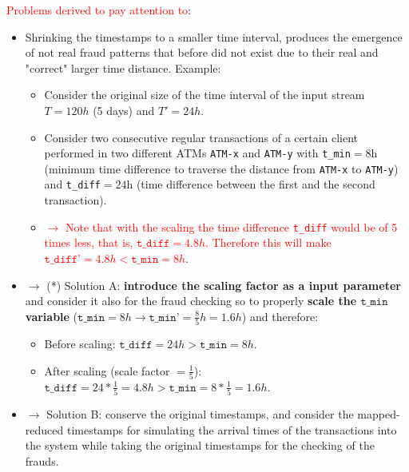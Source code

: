 \documentclass[12pt,a4paper]{article}
\begin{document}
\textcolor{red}{Problems derived to pay attention to}:
\begin{itemize}
  \item Shrinking the timestamps to a smaller time interval, produces the emergence of not real fraud patterns that before did not exist due to their real and "correct" larger time distance. Example:
  \begin{itemize}
  \item Consider the original size of the time interval of the input stream $T=120h$ (5 days) and $T'=24h$.
  \item Consider two consecutive regular transactions of a certain client performed in two different ATMs \texttt{ATM-x} and \texttt{ATM-y} with \texttt{t\_min}$=8$h (minimum time difference to traverse the distance from \texttt{ATM-x} to \texttt{ATM-y}) and \texttt{t\_diff}$=24$h (time difference between the first and the second transaction). 
  \item \textcolor{red}{$\rightarrow$ Note that with the scaling the time difference \texttt{t\_diff} would be of 5 times less, that is, $\texttt{t\_diff}=4.8h$. Therefore this will make $\texttt{t\_diff'}=4.8h < \texttt{t\_min}=8h$}.
  \end{itemize}
  \item $\rightarrow$ (*) Solution A: \textbf{introduce the scaling factor as a input parameter} and consider it also for the fraud checking so to properly \textbf{scale the $\texttt{t\_min}$ variable} ($\texttt{t\_min}=8h \rightarrow \texttt{t\_min'}=\frac{8}{5}h=1.6h$) and therefore: 
  \begin{itemize}
    \item Before scaling: $\texttt{t\_diff}=24h > \texttt{t\_min}=8h$.
    \item After scaling (scale factor $=\frac{1}{5}$): $\texttt{t\_diff}=24*\frac{1}{5}=4.8h > \texttt{t\_min}=8*\frac{1}{5}=1.6h$.
  \end{itemize}
  \item $\rightarrow$ Solution B: conserve the original timestamps, and consider the mapped-reduced timestamps for simulating the arrival times of the transactions into the system while taking the original timestamps for the checking of the frauds.
\end{itemize}
\end{document}
